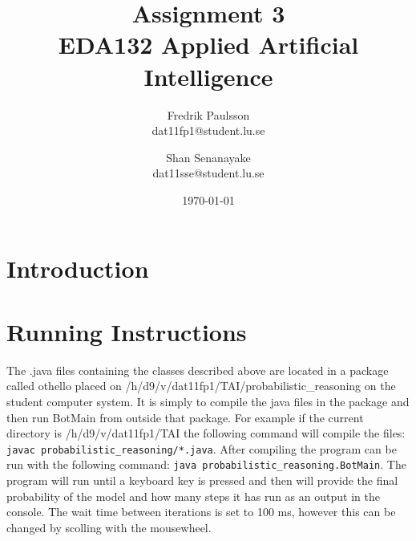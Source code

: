 \documentclass[a4paper]{article}
\title{Assignment 3 \\ EDA132 Applied Artificial Intelligence}
\date{\today}
\author{Fredrik Paulsson \\ dat11fp1@student.lu.se
\and Shan Senanayake \\ dat11sse@student.lu.se}
\begin{document}
\maketitle


\section{Introduction}

\section{Running Instructions} The .java files containing the classes described
above are located in a package called othello placed on
/h/d9/v/dat11fp1/TAI/probabilistic\_reasoning on the student computer system. It
is simply to compile the java files in the package and then run BotMain from
outside that package. For example if the current directory is
/h/d9/v/dat11fp1/TAI the following command will compile the files: \texttt{javac
probabilistic\_reasoning/*.java}. After compiling the program can be run with
the following command: \texttt{java probabilistic\_reasoning.BotMain}. The program will run until a keyboard key is pressed and then will provide the final probability of the model and how many steps it has run as an output in the console. The wait time between iterations is set to 100 ms, however this can be changed by scolling with the mousewheel.

\end{document}
